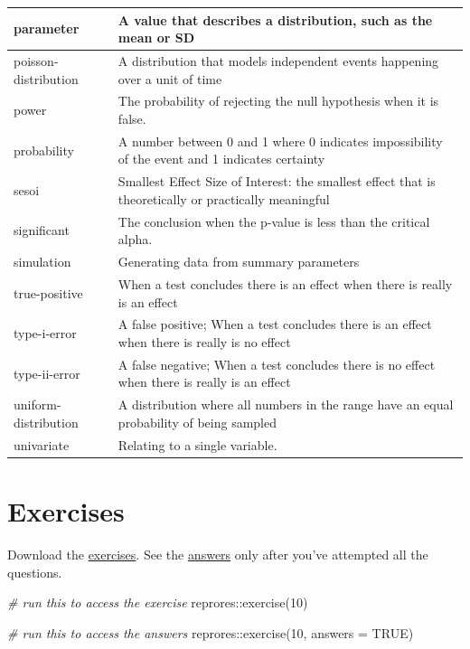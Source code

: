 \documentclass[
  oneside]{book}
\newenvironment{Shaded}{\begin{snugshade}}{\end{snugshade}}
\newcommand{\AttributeTok}[1]{\textcolor[rgb]{0.77,0.63,0.00}{#1}}
\newcommand{\CommentTok}[1]{\textcolor[rgb]{0.56,0.35,0.01}{\textit{#1}}}
\newcommand{\ConstantTok}[1]{\textcolor[rgb]{0.00,0.00,0.00}{#1}}
\newcommand{\DecValTok}[1]{\textcolor[rgb]{0.00,0.00,0.81}{#1}}
\newcommand{\FunctionTok}[1]{\textcolor[rgb]{0.00,0.00,0.00}{#1}}
\newcommand{\NormalTok}[1]{#1}
\newcommand{\SpecialCharTok}[1]{\textcolor[rgb]{0.00,0.00,0.00}{#1}}
\begin{document}
\begin{tabular}{l|l}
\hline
parameter & A value that describes a distribution, such as the mean or SD\\
\hline
poisson-distribution & A distribution that models independent events happening over a unit of time\\
\hline
power & The probability of rejecting the null hypothesis when it is false.\\
\hline
probability & A number between 0 and 1 where 0 indicates impossibility of the event and 1 indicates certainty\\
\hline
sesoi & Smallest Effect Size of Interest: the smallest effect that is theoretically or practically meaningful\\
\hline
significant & The conclusion when the p-value is less than the critical alpha.\\
\hline
simulation & Generating data from summary parameters\\
\hline
true-positive & When a test concludes there is an effect when there is really is an effect\\
\hline
type-i-error & A false positive; When a test concludes there is an effect when there is really is no effect\\
\hline
type-ii-error & A false negative; When a test concludes there is no effect when there is really is an effect\\
\hline
uniform-distribution & A distribution where all numbers in the range have an equal probability of being sampled\\
\hline
univariate & Relating to a single variable.\\
\hline
\end{tabular}

\hypertarget{exercises-sim}{%
\section{Exercises}\label{exercises-sim}}

Download the \href{exercises/10_sim_exercise.Rmd}{exercises}. See the \href{exercises/10_sim_answers.Rmd}{answers} only after you've attempted all the questions.

\begin{Shaded}
\begin{Highlighting}[]
\CommentTok{\# run this to access the exercise}
\NormalTok{reprores}\SpecialCharTok{::}\FunctionTok{exercise}\NormalTok{(}\DecValTok{10}\NormalTok{)}

\CommentTok{\# run this to access the answers}
\NormalTok{reprores}\SpecialCharTok{::}\FunctionTok{exercise}\NormalTok{(}\DecValTok{10}\NormalTok{, }\AttributeTok{answers =} \ConstantTok{TRUE}\NormalTok{)}
\end{Highlighting}
\end{Shaded}
\end{document}
